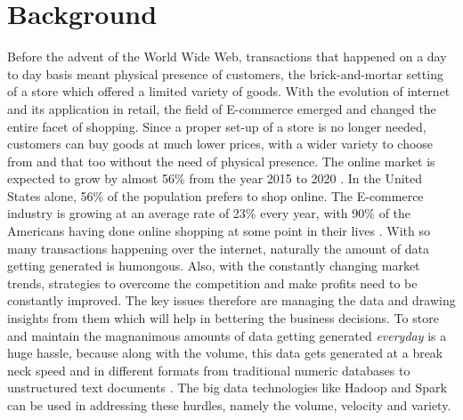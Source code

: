 \section*{Background}
Before the advent of the World Wide Web, transactions that happened on a day to day basis meant physical presence of customers, the brick-and-mortar setting of a store which offered a limited variety of goods. With the evolution of internet and its application in retail, the field of E-commerce emerged and changed the entire facet of shopping. Since a proper set-up of a store is no longer needed, customers can buy goods at much lower prices, with a wider variety to choose from and that too without the need of physical presence. The online market is expected to grow by almost 56\% from the year 2015 to 2020 \cite{link2}. In the United States alone, 56\% of the population prefers to shop online. The E-commerce industry is growing at an average rate of 23\% every year, with 90\% of the Americans having done online shopping at some point in their lives \cite{link3}. With so many transactions happening over the internet, naturally the amount of data getting generated is humongous. Also, with the constantly changing market trends, strategies to overcome the competition and make profits need to be constantly improved. The key issues therefore are managing the data and drawing insights from them which will help in bettering the business decisions. To store and maintain the magnanimous amounts of data getting generated \emph{everyday} is a huge hassle, because along with the volume, this data gets generated at a break neck speed and in different formats from traditional numeric databases to unstructured text documents   \cite{link4}. The big data technologies like Hadoop and Spark can be used in addressing these hurdles, namely the volume, velocity and variety.

